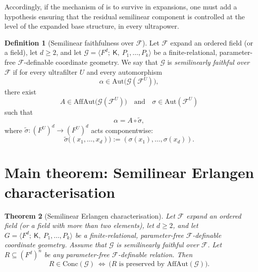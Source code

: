 \documentclass[11pt,a4paper]{article}
\newcommand{\G}{\mathcal{G}}
\newcommand{\F}{\mathcal{F}}
\newtheorem{theorem}{Theorem}[section]
\theoremstyle{definition}
\newtheorem{definition}[theorem]{Definition}
\newtheorem{remark}[theorem]{Remark}
\begin{document}
Accordingly, if the mechanism of \cite{MSS26} is to survive in expansions, one
must add a hypothesis ensuring that the residual semilinear component is
controlled at the level of the expanded base structure, in every
ultrapower.

\label{sec:5.2}



\begin{definition}[Semilinear faithfulness over $\F$]
	\label{def:5.1}
Let $\F$ expand an ordered field (or a field), let $d\ge 2$,
and let $\G=\langle F^d;\ \mathsf K,\ P_1,\dots,P_k\rangle$ be a
finite-relational, parameter-free $\F$-definable coordinate
geometry. We say that $\G$ is \emph{semilinearly faithful over
$\F$} if for every ultrafilter $U$ and every automorphism \[
\alpha\in \mathrm{Aut}\big(\G(\F^U)\big),
\] there exist \[
A\in \mathrm{AffAut}\big(\G(\F^U)\big)\quad\text{and}\quad \sigma\in \mathrm{Aut}(\F^U)
\] such that \[
\alpha = A\circ \widetilde\sigma,
\] where $\widetilde\sigma:(F^U)^d\to (F^U)^d$ acts componentwise: \[
\widetilde\sigma\big((x_1,\dots,x_d)\big) := (\sigma(x_1),\dots,\sigma(x_d)).
\]
\end{definition}




\section{Main theorem: Semilinear Erlangen characterisation}
\label{sec:6}


\begin{theorem}[Semilinear Erlangen characterisation]
	\label{thm:6.1}
Let
$\F$ expand an ordered field (or a field with more than two elements), let
$d\ge 2$, and let $G=\langle F^d;\ \mathsf K,\ P_1,\dots,P_k\rangle$
be a finite-relational, parameter-free $\F$-definable
coordinate geometry. Assume that $\G$ is semilinearly faithful over
$\F$. Let $R\subseteq (F^d)^n$ be any parameter-free
$\F$-definable relation. Then \[
R\in \mathrm{Conc}(\G)\ \Longleftrightarrow\ \big(\text{$R$ is preserved by }\mathrm{AffAut}(\G)\Big).
\]
\end{theorem}
\end{document}
